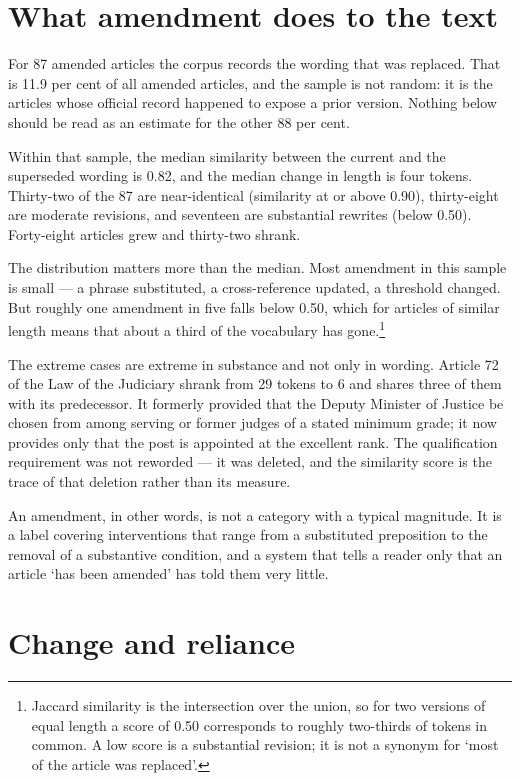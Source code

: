 \documentclass[11pt]{article}
\begin{document}
\section{What amendment does to the text}
\label{sec:magnitude}

For 87 amended articles the corpus records the wording that was replaced. That
is 11.9 per cent of all amended articles, and the sample is not random: it is
the articles whose official record happened to expose a prior version. Nothing
below should be read as an estimate for the other 88 per cent.

Within that sample, the median similarity between the current and the
superseded wording is 0.82, and the median change in length is four tokens.
Thirty-two of the 87 are near-identical (similarity at or above 0.90),
thirty-eight are moderate revisions, and seventeen are substantial rewrites
(below 0.50). Forty-eight articles grew and thirty-two shrank.

The distribution matters more than the median. Most amendment in this sample
is small --- a phrase substituted, a cross-reference updated, a threshold
changed. But roughly one amendment in five falls below 0.50, which for
articles of similar length means that about a third of the vocabulary has
gone.\footnote{Jaccard similarity is the intersection over the union, so for
two versions of equal length a score of 0.50 corresponds to roughly two-thirds
of tokens in common. A low score is a substantial revision; it is not a
synonym for `most of the article was replaced'.}

The extreme cases are extreme in substance and not only in wording. Article 72
of the Law of the Judiciary shrank from 29 tokens to 6 and shares three of
them with its predecessor. It formerly provided that the Deputy Minister of
Justice be chosen from among serving or former judges of a stated minimum
grade; it now provides only that the post is appointed at the excellent rank.
The qualification requirement was not reworded --- it was deleted, and the
similarity score is the trace of that deletion rather than its measure.

An amendment, in other words, is not a category with a typical magnitude. It
is a label covering interventions that range from a substituted preposition to
the removal of a substantive condition, and a system that tells a reader only
that an article `has been amended' has told them very little.

\section{Change and reliance}
\label{sec:reliance}
\end{document}
